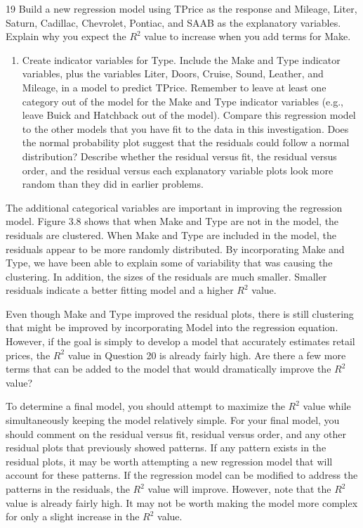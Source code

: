 \documentclass[
]{report}
\providecommand{\tightlist}{%
  \setlength{\itemsep}{0pt}\setlength{\parskip}{0pt}}
\begin{document}
19 Build a new regression model using TPrice as the response and Mileage, Liter, Saturn, Cadillac, Chevrolet, Pontiac, and SAAB as the explanatory variables. Explain why you expect the \(R^2\) value to increase when you add terms for Make.

\begin{enumerate}
\def\labelenumi{\arabic{enumi}.}
\setcounter{enumi}{19}
\tightlist
\item
  Create indicator variables for Type. Include the Make and Type indicator variables, plus the variables Liter, Doors, Cruise, Sound, Leather, and Mileage, in a model to predict TPrice. Remember to leave at least one category out of the model for the Make and Type indicator variables (e.g., leave Buick and Hatchback out of the model). Compare this regression model to the other models that you have fit to the data in this investigation. Does the normal probability plot suggest that the residuals could follow a normal distribution? Describe whether the residual versus fit, the residual versus order, and the residual versus each explanatory variable plots look more random than they did in earlier problems.
\end{enumerate}

The additional categorical variables are important in improving the regression model. Figure 3.8 shows that when Make and Type are not in the model, the residuals are clustered. When Make and Type are included in the model, the residuals appear to be more randomly distributed. By incorporating Make and Type, we have been able to explain some of variability that was causing the clustering. In addition, the sizes of the residuals are much smaller. Smaller residuals indicate a better fitting model and a higher \(R^2\) value.

Even though Make and Type improved the residual plots, there is still clustering that might be improved by incorporating Model into the regression equation. However, if the goal is simply to develop a model that accurately estimates retail prices, the \(R^2\) value in Question 20 is already fairly high. Are there a few more terms that can be added to the model that would dramatically improve the \(R^2\) value?

To determine a final model, you should attempt to maximize the \(R^2\) value while simultaneously keeping the model relatively simple. For your final model, you should comment on the residual versus fit, residual versus order, and any other residual plots that previously showed patterns. If any pattern exists in the residual plots, it may be worth attempting a new regression model that will account for these patterns. If the regression model can be modified to address the patterns in the residuals, the \(R^2\) value will improve. However, note that the \(R^2\) value is already fairly high. It may not be worth making the model more complex for only a slight increase in the \(R^2\) value.
\end{document}
